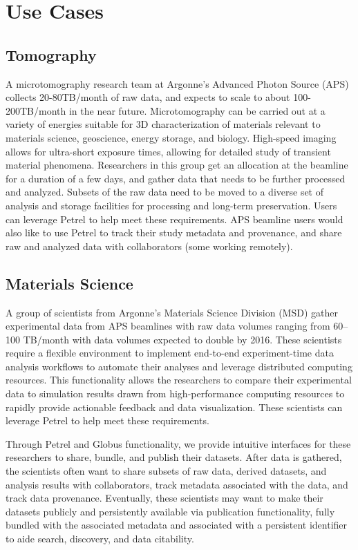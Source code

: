 \documentclass[sigconf]{acmart}
\begin{document}
\section{Use Cases}

\subsection{Tomography}

A microtomography research team at Argonne's Advanced Photon Source (APS) collects 20-80TB/month of raw data, and expects to scale to about 100-200TB/month in the near future. Microtomography can be carried out at a variety of energies suitable for 3D characterization of materials relevant to materials science, geoscience, energy storage, and biology. High-speed imaging allows for ultra-short exposure times, allowing for detailed study of transient material phenomena. Researchers in this group get an allocation at the beamline for a duration of a few days, and gather data that needs to be further processed and analyzed. Subsets of the raw data need to be moved to a diverse set of analysis and storage facilities for processing and long-term preservation. Users can leverage Petrel to help meet these requirements. APS beamline users would also like to use Petrel to track their study metadata and provenance, and share raw and analyzed data with collaborators (some working remotely).



\subsection{Materials Science}

A group of scientists from Argonne's Materials Science Division (MSD) gather experimental data from APS beamlines with raw data volumes ranging from 60--100 TB/month with data volumes expected to double by 2016. These scientists require a flexible environment to implement end-to-end experiment-time data analysis workflows to automate their analyses and leverage distributed computing resources. This functionality allows the researchers to compare their experimental data to simulation results drawn from high-performance computing resources to rapidly provide actionable feedback and data visualization. These scientists can leverage Petrel to help meet these requirements.

Through Petrel and Globus functionality, we provide intuitive interfaces for these researchers to share, bundle, and publish their datasets. After data is gathered, the scientists often want to share subsets of raw data, derived datasets, and analysis results with collaborators, track metadata associated with the data, and track data provenance. Eventually, these scientists may want to make their datasets publicly and persistently available via publication functionality, fully bundled with the associated metadata and associated with a persistent identifier to aide search, discovery, and data citability.
\end{document}
